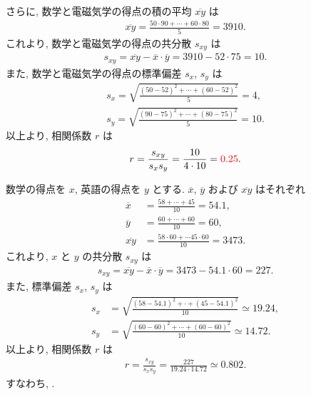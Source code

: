 \begin{qenumerate}
{\begin{enumerate}
{\begin{align}
				\end{align}
				さらに, 数学と電磁気学の得点の積の平均 $\overline{xy}$ は
				\begin{align}
					\overline{xy} = \frac{50\cdot 90 + \cdots + 60\cdot 80}{5} = 3910.
				\end{align}
				これより, 数学と電磁気学の得点の共分散 $s_{xy}$ は
				\begin{align}
					s_{xy} = \overline{xy} - \overline{x}\cdot \overline{y} = 3910 - 52\cdot 75 = 10.
				\end{align}
				また, 数学と電磁気学の得点の標準偏差 $s_{x}$, $s_{y}$ は
				\begin{gather}
					s_{x} = \sqrt{\frac{(50 - 52)^{2} + \cdots + (60 - 52)^{2}}{5}} = 4, \\
					s_{y} = \sqrt{\frac{(90 - 75)^{2} + \cdots + (80 - 75)^{2}}{5}} = 10.
				\end{gather}
				以上より, 相関係数 $r$ は
				\begin{align}
					r = \frac{s_{xy}}{s_{x}s_{y}} = \frac{10}{4\cdot 10} = \textcolor{red}{0.25}.
				\end{align}
			}
		\end{enumerate}
	}
	\item{
		数学の得点を $x$, 英語の得点を $y$ とする.
		$\overline{x}$, $\overline{y}$ および $\overline{xy}$ はそれぞれ
		\begin{align}
			\overline{x} &= \frac{58 + \cdots + 45}{10} = 54.1, \\
			\overline{y} &= \frac{60 + \cdots + 60}{10} = 60, \\
			\overline{xy} &= \frac{58\cdot 60 + \cdots 45\cdot 60}{10} = 3473.
		\end{align}
		これより, $x$ と $y$ の共分散 $s_{xy}$ は
		\begin{align}
			s_{xy} = \overline{xy} - \overline{x}\cdot \overline{y} = 3473 - 54.1\cdot 60 = 227.
		\end{align}
		また, 標準偏差 $s_{x}$, $s_{y}$ は
		\begin{align}
			s_{x} &= \sqrt{\frac{(58 - 54.1)^{2} + \cdot + (45 - 54.1)^{2}}{10}} \simeq 19.24 , \\
			s_{y} &= \sqrt{\frac{(60 - 60)^{2} + \cdots + (60 - 60)^{2}}{10}} \simeq 14.72.
		\end{align}
		以上より, 相関係数 $r$ は
		\begin{align}
			r = \frac{s_{xy}}{s_{x}s_{y}} = \frac{227}{19.24\cdot 14.72} \simeq 0.802.
		\end{align}
		すなわち, .
}
\end{qenumerate}
